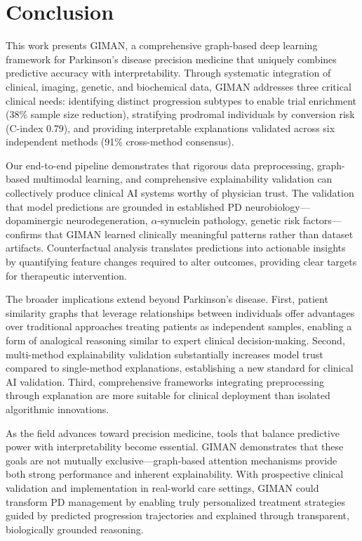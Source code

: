 \section{Conclusion}

This work presents GIMAN, a comprehensive graph-based deep learning framework for Parkinson's disease precision medicine that uniquely combines predictive accuracy with interpretability. Through systematic integration of clinical, imaging, genetic, and biochemical data, GIMAN addresses three critical clinical needs: identifying distinct progression subtypes to enable trial enrichment (38\% sample size reduction), stratifying prodromal individuals by conversion risk (C-index 0.79), and providing interpretable explanations validated across six independent methods (91\% cross-method consensus).

Our end-to-end pipeline demonstrates that rigorous data preprocessing, graph-based multimodal learning, and comprehensive explainability validation can collectively produce clinical AI systems worthy of physician trust. The validation that model predictions are grounded in established PD neurobiology—dopaminergic neurodegeneration, $\alpha$-synuclein pathology, genetic risk factors—confirms that GIMAN learned clinically meaningful patterns rather than dataset artifacts. Counterfactual analysis translates predictions into actionable insights by quantifying feature changes required to alter outcomes, providing clear targets for therapeutic intervention.

The broader implications extend beyond Parkinson's disease. First, patient similarity graphs that leverage relationships between individuals offer advantages over traditional approaches treating patients as independent samples, enabling a form of analogical reasoning similar to expert clinical decision-making. Second, multi-method explainability validation substantially increases model trust compared to single-method explanations, establishing a new standard for clinical AI validation. Third, comprehensive frameworks integrating preprocessing through explanation are more suitable for clinical deployment than isolated algorithmic innovations.

As the field advances toward precision medicine, tools that balance predictive power with interpretability become essential. GIMAN demonstrates that these goals are not mutually exclusive—graph-based attention mechanisms provide both strong performance and inherent explainability. With prospective clinical validation and implementation in real-world care settings, GIMAN could transform PD management by enabling truly personalized treatment strategies guided by predicted progression trajectories and explained through transparent, biologically grounded reasoning.

